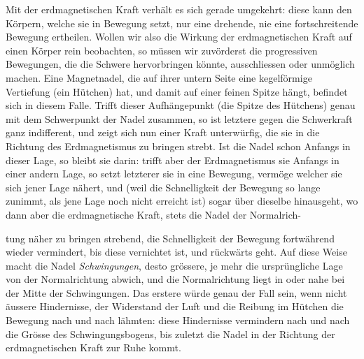 Mit der erdmagnetischen Kraft verhält es sich gerade umgekehrt: diese kann den Körpern, welche sie in Bewegung setzt, nur eine drehende, nie eine fortschreitende Bewegung ertheilen. Wollen wir also die Wirkung der erdmagnetischen Kraft auf einen Körper rein beobachten, so müssen wir zuvörderst die progressiven Bewegungen, die die Schwere hervorbringen könnte, ausschliessen oder unmöglich machen. Eine Magnetnadel, die auf ihrer untern Seite eine kegelförmige Vertiefung (ein Hütchen) hat, und damit auf einer feinen Spitze hängt, befindet sich in diesem Falle. Trifft dieser Aufhängepunkt (die Spitze des Hütchens) genau mit dem Schwerpunkt der Nadel zusammen, so ist letztere gegen die Schwerkraft ganz indifferent, und zeigt sich nun einer Kraft unterwürfig, die sie in die Richtung des Erdmagnetismus zu bringen strebt. Ist die Nadel schon Anfangs in dieser Lage, so bleibt sie darin: trifft aber der Erdmagnetismus sie Anfangs in einer andern Lage, so setzt letzterer sie in eine Bewegung, vermöge welcher sie sich jener Lage nähert, und (weil die Schnelligkeit der Bewegung so lange zunimmt, als jene Lage noch nicht erreicht ist) sogar über dieselbe hinausgeht, wo dann aber die erdmagnetische Kraft, stets die Nadel der Normalrich-
\par\clearpage
{}
\noindent tung näher zu bringen strebend, die Schnelligkeit der Bewegung fortwährend wieder vermindert, bis diese vernichtet ist, und rückwärts geht. Auf diese Weise macht die Nadel \textit{Schwingungen}, desto grössere, je mehr die ursprüngliche Lage von der Normalrichtung abwich, und die Normalrichtung liegt in oder nahe bei der Mitte der Schwingungen. Das erstere würde genau der Fall sein, wenn nicht äussere Hindernisse, der Widerstand der Luft und die Reibung im Hütchen die Bewegung nach und nach lähmten: diese Hindernisse vermindern nach und nach die Grösse des Schwingungsbogens, bis zuletzt die Nadel in der Richtung der erdmagnetischen Kraft zur Ruhe kommt.

